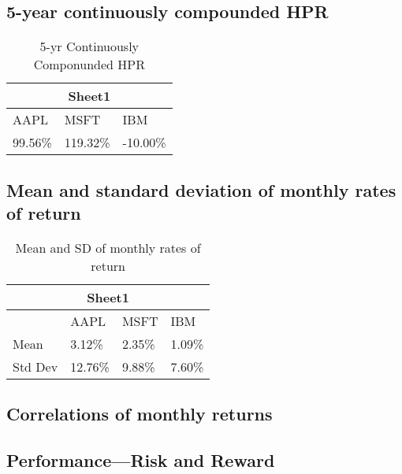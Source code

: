 \documentclass[12pt]{article}
\begin{document}
\subsection{5-year continuously compounded HPR}

\begin{table}[H]
	\centering
	\caption{5-yr Continuously Componunded HPR}
	\begin{tabular}{ |p{2cm}|p{2cm}|p{2cm}| }
		\hline
		\multicolumn{3}{|c|}{Sheet1}\\
		\hline
		AAPL & MSFT & IBM\\
		\hline
		99.56\% & 119.32\% & -10.00\%\\
		\hline
	\end{tabular}
\end{table}

\subsection{Mean and standard deviation of monthly rates of return}
\begin{table}[H]
	\centering
	\caption{Mean and SD of monthly rates of return}
	\begin{tabular}{ |p{2cm}||p{2cm}|p{2cm}|p{2cm}| }
		\hline
		\multicolumn{4}{|c|}{Sheet1}\\
		\hline
		& AAPL & MSFT & IBM\\
		\hline
		Mean & 3.12\% & 2.35\% & 1.09\%\\
		Std Dev & 12.76\% & 9.88\% & 7.60\%\\
		\hline
	\end{tabular}
\end{table}

\subsection{Correlations of monthly returns}

\subsection{Performance---Risk and Reward}
\end{document}
